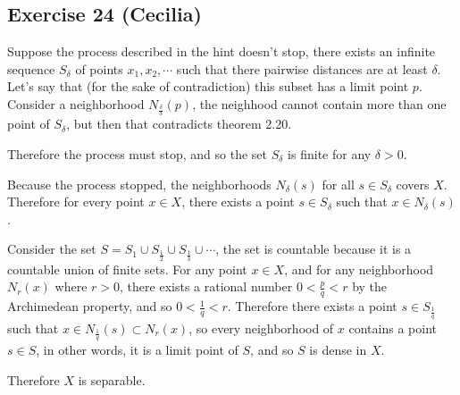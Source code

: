 \subsection*{Exercise 24 (Cecilia)}
Suppose the process described in the hint doesn't stop, there exists an infinite sequence $ S_{\delta} $ of points $ x_1, x_2, \cdots $ such that there pairwise distances are at least $ \delta $. Let's say that (for the sake of contradiction) this subset has a limit point $ p $. Consider a neighborhood $ N_{\frac{\delta}{3}}(p) $, the neighhood cannot contain more than one point of $ S_{\delta} $, but then that contradicts theorem 2.20.

Therefore the process must stop, and so the set $ S_{\delta} $ is finite for any $ \delta > 0 $.

Because the process stopped, the neighborhoods $ N_{\delta}(s) $ for all $ s \in S_{\delta} $ covers $ X $. Therefore for every point $ x \in X $, there exists a point $ s \in S_{\delta} $ such that $ x \in N_{\delta}(s) $.

Consider the set $ S = S_1 \cup S_{\frac{1}{2}} \cup S_{\frac{1}{3}} \cup \cdots $, the set is countable because it is a countable union of finite sets. For any point $ x \in X $, and for any neighborhood $ N_r(x) $ where $ r > 0 $, there exists a rational number $ 0 < \frac{p}{q} < r $ by the Archimedean property, and so $ 0 < \frac{1}{q} < r $. Therefore there exists a point $ s \in S_{\frac{1}{q}} $ such that $ x \in N_{\frac{1}{q}}(s) \subset N_r(x) $, so every neighborhood of $ x $ contains a point $ s \in S $, in other words, it is a limit point of $ S $, and so $ S $ is dense in $ X $.

Therefore $ X $ is separable.